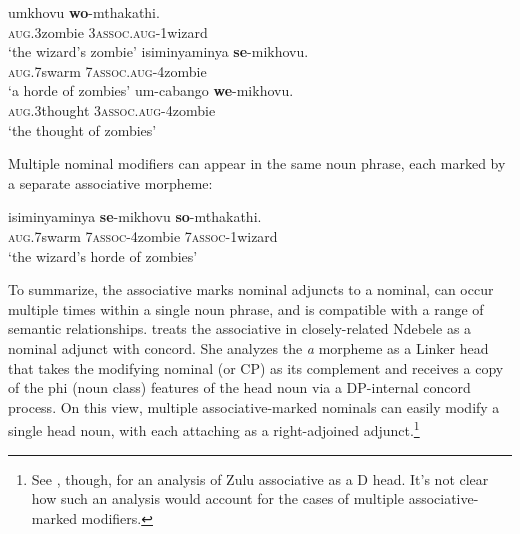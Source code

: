 \documentclass[output=paper,colorlinks,citecolor=brown]{langscibook}
\begin{document}
\ea%
    \label{ex:halpert:10}
    \ea%
    \label{ex:halpert:10a}
    \gll    umkhovu \textbf{wo}-mthakathi.\\
            \textsc{aug}.3zombie 3\textsc{assoc}.\textsc{aug}-1wizard\\
    \glt    `the wizard's zombie'%
    \ex%
    \label{ex:halpert:10b}
    \gll    isiminyaminya \textbf{se}-mikhovu.\\
            \textsc{aug}.7swarm 7\textsc{assoc}.\textsc{aug}-4zombie\\
    \glt    `a horde of zombies' %
    \ex%
    \label{ex:halpert:10c}
    \gll    um-cabango \textbf{we}-mikhovu.\\
            \textsc{aug}.3thought 3\textsc{assoc}.\textsc{aug}-4zombie\\
    \glt    `the thought of zombies' %
    \z 
\z 

Multiple nominal modifiers can appear in the same noun phrase, each marked by a separate associative morpheme:

\ea%
    \label{ex:halpert:11}
    \gll    isiminyaminya \textbf{se}-mikhovu \textbf{so}-mthakathi.\\
            \textsc{aug}.7swarm 7\textsc{assoc}-4zombie 7\textsc{assoc}-1wizard\\
    \glt    `the wizard's horde of zombies'
\z 

To summarize, the associative marks nominal adjuncts to a nominal, can occur multiple times within a single noun phrase, and is compatible with a range of semantic relationships. \citet{Pietraszko2019} treats the associative in closely-related Ndebele as a nominal adjunct with concord. She analyzes the \textit{a} morpheme as a Linker head that takes the modifying nominal (or CP) as its complement and receives a copy of the  phi (noun class) features of the head noun via a DP-internal concord process.  On this view, multiple associative-marked nominals can easily modify a single head noun, with each attaching as a right-adjoined adjunct.\footnote{See \citet{Jones2018}, though, for an analysis of Zulu associative as a D head.  It's not clear how such an analysis would account for the cases of multiple associative-marked modifiers.} 
\end{document}
